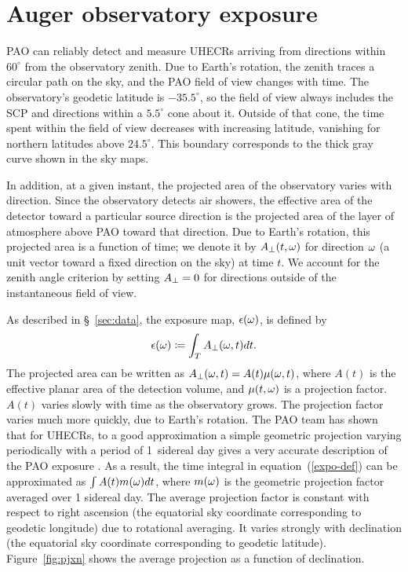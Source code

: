 \section{Auger observatory exposure}
\label{app:expo}

PAO can reliably detect and measure UHECRs arriving from directions within
$60^\circ$ from the observatory zenith.  Due to Earth's rotation, the zenith
traces a circular path on the sky, and the PAO field of view changes with time.
The observatory's geodetic latitude is $-35.5^\circ$, so the field of view
always includes the SCP and directions within a $5.5^\circ$ cone about it.
Outside of that cone, the time spent within the field of view decreases with
increasing latitude, vanishing for northern latitudes above $24.5^\circ$.  This
boundary corresponds to the thick gray curve shown in the sky maps.

In addition, at a given instant, the projected area of the observatory varies
with direction.  Since the observatory detects air showers, the effective area
of the detector toward a particular source direction is the projected area of
the layer of atmosphere above PAO toward that direction.  Due to Earth's
rotation, this projected area is a function of time; we denote it by
$A_\perp(t,\omega)$ for direction $\omega$ (a unit vector toward a fixed direction
on the sky) at time $t$.  We account for the zenith angle criterion by
setting $A_\perp=0$ for directions outside of the instantaneous field of view.

As described in \S~\ref{sec:data}, the exposure map, $\epsilon(\omega)$,
is defined by
\begin{equation}
\expo(\tdrxn) \coloneqq \int_T  \Aperp(\tdrxn,t) dt.
\label{expo-def}
\end{equation}
The projected area can be written as $A_\perp(\omega,t) = A(t) \mu(\omega,t)$,
where $A(t)$ is the effective planar area of the detection volume, and
$\mu(t,\omega)$ is a projection factor.  $A(t)$ varies slowly with time as
the observatory grows.  The projection factor varies much more quickly, due
to Earth's rotation. The PAO team has shown that for UHECRs, to a good
approximation a simple geometric projection varying periodically with a
period of 1~sidereal day gives a very accurate description of the PAO
exposure \cite{2001APh....14..271S}. As a result, the time integral in
equation~(\ref{expo-def}) can be approximated as $\int A(t) m(\omega) dt$,
where $m(\omega)$ is the geometric projection factor averaged over 1
sidereal day. The average projection factor is constant with respect to
right ascension (the equatorial sky coordinate corresponding to geodetic
longitude) due to rotational averaging.  It varies strongly with declination
(the equatorial sky coordinate corresponding to geodetic latitude).
Figure~\ref{fig:pjxn} shows the average projection as a function of
declination.

